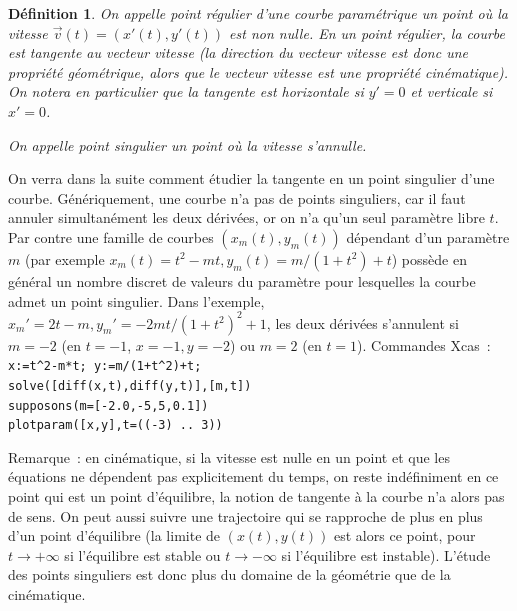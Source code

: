 \documentclass[a4paper,11pt]{article}
\newtheorem{defn}[thm]{D\'efinition}
\begin{document}
\begin{defn}
On appelle point r\'egulier d'une courbe param\'etrique
un point o\`u la vitesse $\overrightarrow{v}(t)=(x'(t),y'(t))$ est non nulle.
En un point r\'egulier, la courbe est tangente au vecteur vitesse
(la direction du vecteur vitesse est donc une propri\'et\'e
g\'eom\'etrique, alors que le vecteur vitesse est une propri\'et\'e
cin\'ematique).
On notera en particulier que la tangente est horizontale si $y'=0$
et verticale si $x'=0$.

On appelle point singulier 
un point o\`u la vitesse s'annulle.
\end{defn}
On verra dans la suite comment \'etudier la tangente en un point
singulier d'une courbe. G\'en\'eriquement, une courbe n'a pas
de points singuliers, car il faut annuler simultan\'ement les
deux d\'eriv\'ees, or on n'a qu'un seul param\`etre libre $t$. Par contre
une famille de courbes $(x_m(t),y_m(t))$ d\'ependant d'un param\`etre
$m$ (par exemple $x_m(t)=t^2-mt, y_m(t)=m/(1+t^2)+t$)
poss\`ede en g\'en\'eral un nombre discret de valeurs du
param\`etre pour lesquelles la courbe admet un point singulier.
Dans l'exemple, $x_m'=2t-m, y_m'=-2mt/(1+t^2)^2+1$, les deux 
d\'eriv\'ees s'annulent si $m=-2$ 
(en $t=-1$, $x=-1, y=-2$) ou $m=2$ (en $t=1$).
Commandes Xcas~:
\verb|x:=t^2-m*t; y:=m/(1+t^2)+t;|\\
\verb|solve([diff(x,t),diff(y,t)],[m,t])|\\
\verb|supposons(m=[-2.0,-5,5,0.1])| \\
\verb|plotparam([x,y],t=((-3) .. 3))|

Remarque~: en cin\'ematique, si la vitesse est nulle en un point
et que les \'equations ne d\'ependent pas explicitement du temps,
on reste ind\'efiniment en ce point qui est un point d'\'equilibre,
la notion de tangente \`a la courbe n'a alors pas de sens.
On peut aussi suivre une trajectoire qui se rapproche 
de plus en plus d'un point d'\'equilibre (la limite de $(x(t),y(t))$
est alors ce point, pour $t \rightarrow +\infty$ si l'\'equilibre
est stable ou $t \rightarrow - \infty$ si l'\'equilibre est instable).
L'\'etude des points singuliers est donc plus du domaine de la
g\'eom\'etrie que de la cin\'ematique.
\end{document}
